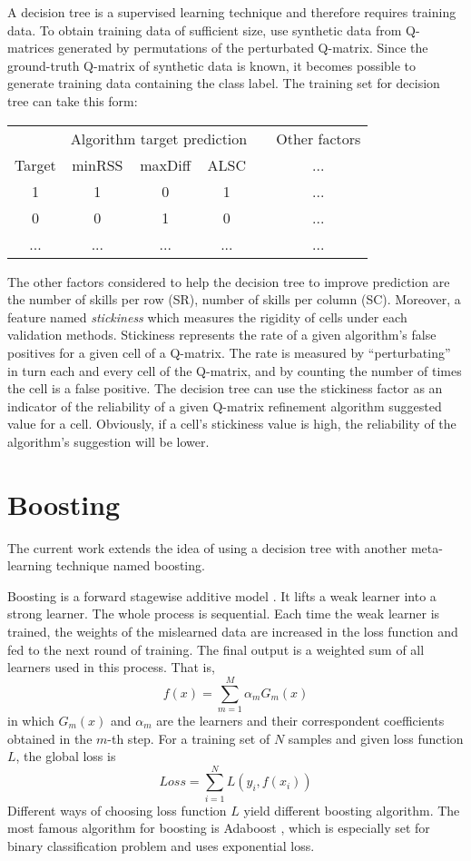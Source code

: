 \documentclass{edm_template}
\begin{document}
A decision tree is a supervised learning technique and therefore requires training data. To obtain training data of sufficient size,  use synthetic data from Q-matrices generated by permutations of the perturbated Q-matrix. Since the ground-truth Q-matrix of synthetic data is known, it becomes possible to generate training data containing the class label.  The training set for decision tree can take this form:

\begin{tabular}{ c| c c c l c}
 & \multicolumn{3}{c}{Algorithm target prediction} & & Other factors\\
\cline{2-4} \cline{6-6}
  Target & minRSS & maxDiff & ALSC && ...\\
  \hline
  1 & 1 & 0 & 1 &&  ...\\
  0 & 0 & 1 & 0 &&  ...\\
  ... &... &... &... && ...\\
\end{tabular}

The other factors considered to help the decision tree to improve prediction are the number of skills per row (SR), number of skills per column (SC). Moreover, a feature named \textit{stickiness} which measures the rigidity of cells under each validation methods. Stickiness represents the rate of a given algorithm's false positives for a given cell of a Q-matrix.  The rate is measured by ``perturbating'' in turn each and every cell of the Q-matrix, and by counting the number of times the cell is a false positive.  The decision tree can use the stickiness factor as an indicator of the reliability of a given Q-matrix refinement algorithm suggested value for a cell.  Obviously, if a cell's stickiness value is high, the reliability of the algorithm's suggestion will be lower.  

\section{Boosting}

The current work extends the idea of using a decision tree with another meta-learning technique named boosting.

Boosting \cite{schapire2012boosting} is a forward stagewise additive model \cite{murphy2012machine}. It lifts a weak learner into a strong learner. The whole process is sequential. Each time the weak learner is trained, the weights of the mislearned data are increased in the loss function and fed to the next round of training. The final output is a weighted sum of all learners used in this process. That is,
$$ f(x)=\sum\limits_{m=1}^M\alpha_mG_m(x)$$
in which $G_m(x)$ and $\alpha_m$  are the learners and their correspondent coefficients obtained in the $m$-th step. For a training set of $N$ samples and given loss function $L$, the global loss is
$$ Loss=\sum\limits_{i=1}^NL(y_i,f(x_i))$$
Different ways of choosing loss function $L$ yield different boosting algorithm. The most famous algorithm for boosting is Adaboost \cite{freund1997decision}, which is especially set for binary classification problem and uses exponential loss. 
\end{document}
